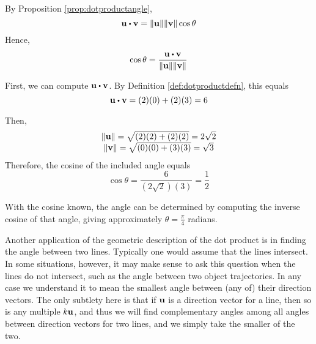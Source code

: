 \begin{solution}
By Proposition \ref{prop:dotproductangle},
\begin{equation*}
\vect{u}\dotprod \vect{v}=\norm{\vect{u}} \norm{\vect{v}
} \cos \theta 
\end{equation*}
Hence, 
\begin{equation*}
\cos \theta =\frac{\vect{u}\dotprod \vect{v}}{\norm{\vect{u}} \norm{\vect{v}
}}
\end{equation*}
 
First, we can compute $\vect{u}\dotprod \vect{v}$. By Definition \ref{def:dotproductdefn}, this equals
\begin{equation*}
\vect{u}\dotprod \vect{v}
=
(2)(0) + (2)(3) = 6
\end{equation*}

Then, 
\begin{equation*}
\begin{array}{c}
\|{\bf u}\|
=
\sqrt{(2)(2)+(2)(2)}=2\sqrt{2}\\
\|{\bf v}\|
=
\sqrt{(0)(0)+(3)(3)}=\sqrt{3}
\end{array}
\end{equation*}
 Therefore, the cosine of the included angle equals
\begin{equation*}
\cos \theta =\frac{6}{(2\sqrt{2})(3)}=\frac{1}{2}
\end{equation*}

With the cosine known, the angle can be determined by computing the
inverse cosine of that angle, giving approximately  $\theta =\frac{\pi}{4}$ radians. 
\end{solution}

Another application of the geometric description of the dot product is
in finding the angle between two lines. Typically one would assume that the
lines intersect. In some situations, however, it may make sense to ask this
question when the lines do not intersect, such as the angle between
two object trajectories. In any case we understand it to mean the
smallest angle between (any of) their direction vectors. The only
subtlety here is that if ${\bf u}$ is a direction vector for a line,
then so is any multiple $k{\bf u}$, and thus we will find complementary angles
among all angles between direction vectors for two lines, and we
simply take the smaller of the two.

